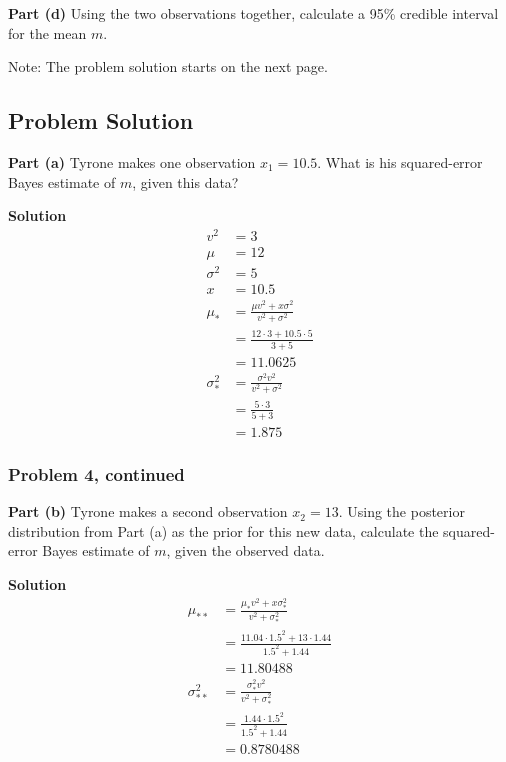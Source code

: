 \documentclass[12pt]{article}
\theoremstyle{definition}
\begin{document}
\bigskip
\noindent
{\bf Part (d)} Using the two observations together, calculate a 95\% credible interval for the mean $m$.

\bigskip
\noindent
Note: The problem solution starts on the next page.

\newpage
\subsection*{Problem Solution}

\noindent
{\bf Part (a)} Tyrone makes one observation $x_1 = 10.5$. What is his squared-error Bayes estimate of $m$, given this data?

\bigskip
\noindent
{\bf Solution} 
\begin{align*}
v^2 &= 3\\
\mu &= 12\\
\sigma^2 &= 5\\
x &= 10.5\\
\mu_* &= \frac{\mu v^2 + x\sigma^2}{v^2 + \sigma^2}\\
&= \frac{12 \cdot 3 + 10.5 \cdot 5}{3 + 5}\\
&= 11.0625\\
\sigma^2_* &= \frac{\sigma^2 v^2}{v^2 + \sigma^2}\\
&= \frac{5 \cdot 3}{5 + 3}\\
&= 1.875
\end{align*}


\newpage
\subsubsection*{Problem 4, continued}

\noindent
{\bf Part (b)} Tyrone makes a second observation $x_2 = 13$. Using the posterior distribution from Part (a) as the prior for this new data, calculate the squared-error Bayes estimate of $m$, given the observed data.

\bigskip
\noindent
{\bf Solution} 
\begin{align*}
\mu_{**} &= \frac{\mu_* v^2 + x\sigma^2_*}{v^2 + \sigma^2_*}\\
&= \frac{11.04 \cdot 1.5^2 + 13 \cdot 1.44}{1.5^2 + 1.44}\\
&= 11.80488\\
\sigma^2_{**} &= \frac{\sigma^2_* v^2}{v^2 + \sigma^2_*}\\
&= \frac{1.44 \cdot 1.5^2}{1.5^2 + 1.44}\\
&= 0.8780488
\end{align*}
\end{document}
